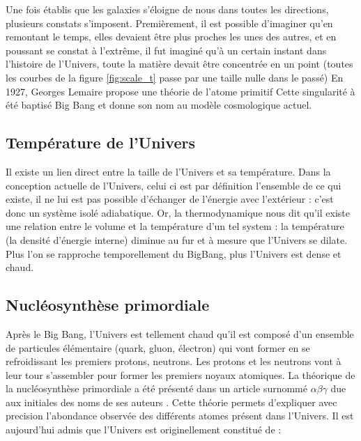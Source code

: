 Une fois établis que les galaxies s'éloigne de nous dans toutes les directions, plusieurs constats s'imposent.
Premièrement, il est possible d'imaginer qu'en remontant le temps, elles devaient être plus proches les unes des autres, et en poussant se constat à l’extrême, il fut imaginé qu'à un certain instant dans l'histoire de l'Univers, toute la matière devait être concentrée en un point (toutes les courbes de la figure \ref{fig:scale_t} passe par une taille nulle dans le passé)
En 1927, Georges Lemaire propose une théorie de l'atome primitif \cite{1927ASSB...47...49L} 
Cette singularité à été baptisé Big Bang et donne son nom au modèle cosmologique actuel.

\subsection{Température de l'Univers}

Il existe un lien direct entre la taille de l'Univers et sa température.
Dans la conception actuelle de l'Univers, celui ci est par définition l'ensemble de ce qui existe, il ne lui est pas possible d'échanger de l’énergie avec l’extérieur : c'est donc un système isolé adiabatique.
Or, la thermodynamique nous dit qu'il existe une relation entre le volume et la température d'un tel system : la température (la densité d'énergie interne) diminue au fur et à mesure que l'Univers se dilate.
Plus l'on se rapproche temporellement du BigBang, plus l'Univers est dense et chaud.

\subsection{Nucléosynthèse primordiale}
\label{sec:nucleosynthese_primordiale}
Après le Big Bang, l'Univers est tellement chaud qu'il est composé d'un ensemble de particules élémentaire (quark, gluon, électron) qui vont former en se refroidissant les premiers protons, neutrons.
Les protons et les neutrons vont à leur tour s'assembler pour former les premiers noyaux atomiques.
La théorique de la nucléosynthèse primordiale a été présenté dans un article surnommé $\alpha \beta \gamma$ due aux initiales des noms de ses auteurs \citep{PhysRev.73.803}.
Cette théorie permets d'expliquer avec precision l'abondance observée des différents atomes présent dans l'Univers.
Il est aujourd'hui admis que l'Univers est originellement constitué de : 

